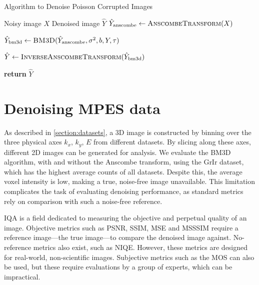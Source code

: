 \begin{algorithm}
    \caption{Algorithm to Denoise Poisson Corrupted Images}\label{alg:anscombe-bm3d}
    \begin{algorithmic}[1]
    \Require Noisy image $X$
    \Ensure Denoised image $\hat{Y}$
    \Statex
        \State $\hat{Y}_{\text{anscombe}} \gets \textsc{AnscombeTransform}(X)$
        
        \State $\hat{Y}_{\text{bm3d}} \gets \textsc{BM3D}(\hat{Y}_{\text{anscombe}}, \sigma^2, b, Y, \tau)$
        
        \State $\hat{Y} \gets \textsc{InverseAnscombeTransform}(\hat{Y}_{\text{bm3d}})$
        
        \State \textbf{return} $\hat{Y}$
    \EndProcedure
    \end{algorithmic}
\end{algorithm}

\section{Denoising MPES data}
As described in \cref{section:datasets}, a 3D image is constructed by binning over the three physical axes $k_x$, $k_y$, $E$ from different datasets. By slicing along these axes, different 2D images can be generated for analysis. We evaluate the \gls{BM3D} algorithm, with and without the Anscombe transform, using the \gls{GrIr} dataset, which has the highest average counts of all datasets. Despite this, the average voxel intensity is low, making a true, noise-free image unavailable. This limitation complicates the task of evaluating denoising performance, as standard metrics rely on comparison with such a noise-free reference.

\Gls{IQA} is a field dedicated to measuring the objective and perpetual quality of an image. Objective metrics such as \gls{PSNR}, \gls{SSIM}, \gls{MSE} and \gls{MSSSIM} require a reference image---the true image---to compare the denoised image against. No-reference metrics also exist, such as \gls{NIQE}. However, these metrics are designed for real-world, non-scientific images. Subjective metrics such as the \gls{MOS} can also be used, but these require evaluations by a group of experts, which can be impractical.


